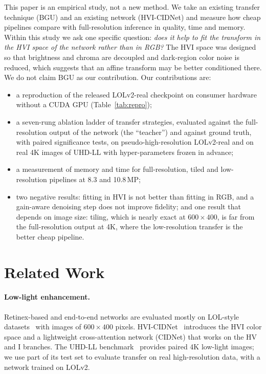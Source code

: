 \documentclass[runningheads]{llncs}
\begin{document}
This paper is an empirical study, not a new method. We take an existing transfer technique (BGU) and an existing network (HVI-CIDNet) and measure how cheap pipelines compare with full-resolution inference in quality, time and memory. Within this study we ask one specific question: \emph{does it help to fit the transform in the HVI space of the network rather than in RGB?} The HVI space was designed so that brightness and chroma are decoupled and dark-region color noise is reduced, which suggests that an affine transform may be better conditioned there. We do not claim BGU as our contribution. Our contributions are:
\begin{itemize}
\item a reproduction of the released LOLv2-real checkpoint on consumer hardware without a CUDA GPU (Table~\ref{tab:repro});
\item a seven-rung ablation ladder of transfer strategies, evaluated against the full-resolution output of the network (the ``teacher'') and against ground truth, with paired significance tests, on pseudo-high-resolution LOLv2-real and on real 4K images of UHD-LL with hyper-parameters frozen in advance;
\item a measurement of memory and time for full-resolution, tiled and low-resolution pipelines at 8.3 and 10.8\,MP;
\item two negative results: fitting in HVI is not better than fitting in RGB, and a gain-aware denoising step does not improve fidelity; and one result that depends on image size: tiling, which is nearly exact at $600{\times}400$, is far from the full-resolution output at 4K, where the low-resolution transfer is the better cheap pipeline.
\end{itemize}

\section{Related Work}
\paragraph{Low-light enhancement.} Retinex-based and end-to-end networks are evaluated mostly on LOL-style datasets~\cite{retinexnet,lolv2} with images of $600{\times}400$ pixels. HVI-CIDNet~\cite{hvicidnet} introduces the HVI color space and a lightweight cross-attention network (CIDNet) that works on the HV and I branches. The UHD-LL benchmark~\cite{uhdll} provides paired 4K low-light images; we use part of its test set to evaluate transfer on real high-resolution data, with a network trained on LOLv2.
\end{document}
